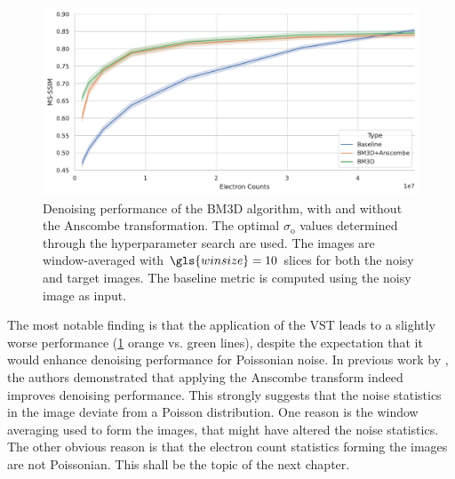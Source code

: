 \begin{figure}
    \centering
    \includegraphics[width=1\linewidth]{images/bm3d_msssim.pdf}
    \caption{Denoising performance of the \gls{BM3D} algorithm, with and without the Anscombe transformation. The optimal $\sigma_{\text{o}}$ values determined through the hyperparameter search are used. The images are window-averaged with $\gls{winsize}=10$ slices for both the noisy and target images. The baseline metric is computed using the noisy image as input.}
    \label{fig:bm3d-msssim}
\end{figure}


The most notable finding is that the application of the \gls{VST} leads to a slightly worse performance (\cref{fig:bm3d-msssim} orange vs. green lines), despite the expectation that it would enhance denoising performance for Poissonian noise. In previous work by \citeauthor{makitaloOptimalInversionAnscombe2011}, the authors demonstrated that applying the Anscombe transform indeed improves denoising performance. This strongly suggests that the noise statistics in the image deviate from a Poisson distribution. One reason is the window averaging used to form the images, that might have altered the noise statistics. The other obvious reason is that the electron count statistics forming the images are not Poissonian. This shall be the topic of the next chapter. 
